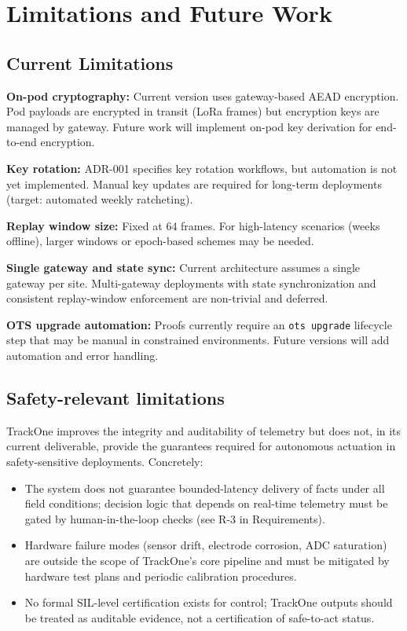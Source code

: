 \section{Limitations and Future Work}
\label{sec:limitations-future-work}

\subsection{Current Limitations}\label{subsec:current-limitations}

\textbf{On-pod cryptography:} Current version uses gateway-based \ac{AEAD} encryption.
Pod payloads are encrypted in transit (\ac{LoRa} frames) but encryption keys are managed by gateway.
Future work will implement on-pod key derivation for end-to-end encryption.

\textbf{Key rotation:} \ac{ADR}-001 specifies key rotation workflows, but automation is not yet implemented.
Manual key updates are required for long-term deployments (target: automated weekly ratcheting).

\textbf{Replay window size:} Fixed at 64 frames.
For high-latency scenarios (weeks offline), larger windows or epoch-based schemes may be needed.

\textbf{Single gateway and state sync:} Current architecture assumes a single gateway per site.
Multi-gateway deployments with state synchronization and consistent replay-window enforcement are non-trivial and deferred.

\textbf{OTS upgrade automation:} Proofs currently require an \texttt{ots upgrade} lifecycle step that may be manual in constrained environments.
Future versions will add automation and error handling.

\subsection{Safety-relevant limitations}\label{subsec:safety-relevant-limitations}
TrackOne improves the integrity and auditability of telemetry but does not, in its current deliverable, provide the guarantees required for autonomous actuation in safety-sensitive deployments.
Concretely:
\begin{itemize}[nosep]
  \item The system does not guarantee bounded-latency delivery of facts under all field conditions; decision logic that depends on real-time telemetry must be gated by human-in-the-loop checks (see R-3 in Requirements).
  \item Hardware failure modes (sensor drift, electrode corrosion, ADC saturation) are outside the scope of TrackOne's core pipeline and must be mitigated by hardware test plans and periodic calibration procedures.
  \item No formal \ac{SIL}-level certification exists for control; TrackOne outputs should be treated as auditable evidence, not a certification of safe-to-act status.
\end{itemize}

